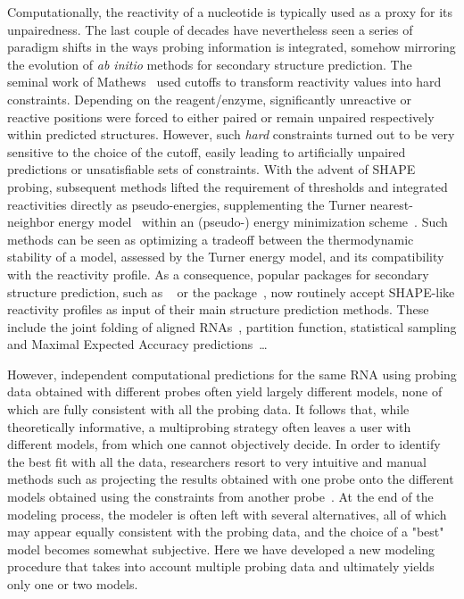 \documentclass[a4,center,fleqn]{NAR}
\begin{document}
\enlargethispage{-50.1pt}


Computationally, the reactivity of a nucleotide is typically used as a proxy for its unpairedness. The last couple of decades have nevertheless seen a series of paradigm shifts in the ways probing information is integrated, somehow mirroring the evolution of {\em ab initio} methods for secondary structure prediction. The seminal work of Mathews~\cite{Mathews2004} used cutoffs to transform reactivity values into hard constraints. Depending on the reagent/enzyme, significantly unreactive or reactive positions were forced to either paired or remain unpaired respectively within predicted structures. However, such \emph{hard} constraints turned out to be very sensitive to the choice of the cutoff, easily leading to artificially unpaired predictions or unsatisfiable sets of constraints. With the advent of SHAPE probing, subsequent methods lifted the requirement of thresholds and integrated reactivities directly as pseudo-energies, supplementing the Turner nearest-neighbor energy model~\cite{Turner2010} within an (pseudo-) energy minimization scheme~\cite{Deigan2009,Zarringhalam2012,Washietl2012}. Such methods can be seen as optimizing a tradeoff between the thermodynamic stability of a model, assessed by the Turner energy model, and its compatibility with the reactivity profile. As a consequence, popular packages for secondary structure prediction, such as ~\cite{Mathews2004} or the  package~\cite{Lorenz2011}, now routinely accept SHAPE-like reactivity profiles as input of their main structure prediction methods. These include the joint folding of aligned RNAs~\cite{Lavender2015}, partition function, statistical sampling and Maximal Expected Accuracy predictions~\cite{Spasic2017}\ldots 


However, independent computational predictions for the same RNA using probing data obtained with different probes often yield largely different models, none of which are fully consistent with all the probing data. It follows that, while theoretically informative, a multiprobing strategy often leaves a user with different models, from which one cannot objectively decide. In order to identify the best fit with all the data, researchers resort to very intuitive and manual methods such as projecting the results obtained with one probe onto the different models obtained using the constraints from another probe~\cite{Herbreteau2005,James2008,Weill2004}. At the end of the modeling process, the modeler is often left with several alternatives, all of which may appear equally consistent with the probing data, and the choice of a "best" model becomes somewhat subjective. Here we have developed a new modeling procedure that takes into account multiple probing data and ultimately yields only one or two models.
\end{document}
